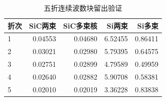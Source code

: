 \begin{table}[htbp]\centering
\caption{五折连续波数块留出验证}\label{tab:cv}
\begin{tabular}{lrrrr}
\toprule
折次 & SiC两束 & SiC多束核 & Si两束 & Si多束\\\midrule
1 & 0.04553 & 0.04680 & 6.52455 & 0.86411\\
2 & 0.03021 & 0.02980 & 5.79395 & 0.64575\\
3 & 0.02751 & 0.02899 & 4.79589 & 0.49959\\
4 & 0.02640 & 0.02882 & 5.90708 & 0.58381\\
5 & 0.02010 & 0.02019 & 3.36228 & 0.83838\\
\bottomrule
\end{tabular}\end{table}
